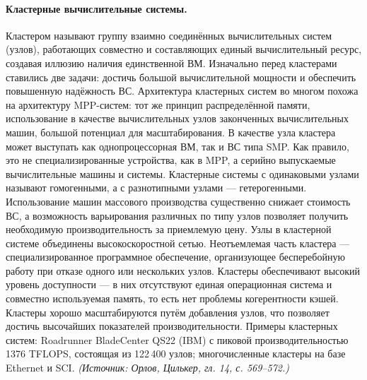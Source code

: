 \documentclass[a4paper,12pt]{article}
\begin{document}
\paragraph{Кластерные вычислительные системы.}
Кластером называют группу взаимно соединённых вычислительных систем (узлов), работающих совместно и составляющих единый вычислительный ресурс, создавая иллюзию наличия единственной ВМ. Изначально перед кластерами ставились две задачи: достичь большой вычислительной мощности и обеспечить повышенную надёжность ВС. Архитектура кластерных систем во многом похожа на архитектуру MPP-систем: тот же принцип распределённой памяти, использование в качестве вычислительных узлов законченных вычислительных машин, большой потенциал для масштабирования. В качестве узла кластера может выступать как однопроцессорная ВМ, так и ВС типа SMP. Как правило, это не специализированные устройства, как в MPP, а серийно выпускаемые вычислительные машины и системы. Кластерные системы с одинаковыми узлами называют гомогенными, а с разнотипными узлами — гетерогенными. Использование машин массового производства существенно снижает стоимость ВС, а возможность варьирования различных по типу узлов позволяет получить необходимую производительность за приемлемую цену. Узлы в кластерной системе объединены высокоскоростной сетью. Неотъемлемая часть кластера — специализированное программное обеспечение, организующее бесперебойную работу при отказе одного или нескольких узлов. Кластеры обеспечивают высокий уровень доступности — в них отсутствуют единая операционная система и совместно используемая память, то есть нет проблемы когерентности кэшей. Кластеры хорошо масштабируются путём добавления узлов, что позволяет достичь высочайших показателей производительности. Примеры кластерных систем: Roadrunner BladeCenter QS22 (IBM) с пиковой производительностью 1376 TFLOPS, состоящая из 122\,400 узлов; многочисленные кластеры на базе Ethernet и SCI.
\textit{(Источник: Орлов, Цилькер, гл. 14, с. 569--572.)}
\end{document}
